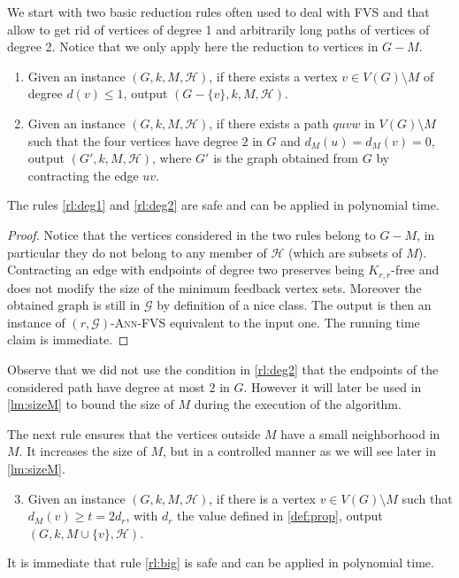 \documentclass{amsart}
\newcommand{\KR}[1]{KR$_ #1$}
\newcommand{\G}{\mathcal{G}}
\newcommand{\dM}{d_M}
\newcommand{\mH}{\mathcal{H}}
\newcommand{\FVS}{\textsc{FVS}\xspace}
\newcommand{\AFVS}{\textsc{$(r,\G)$-Ann-FVS}\xspace}
\newcommand{\ruleref}[1]{\hyperref[#1]{\ref*{#1}}}
\begin{document}
We start with two basic reduction rules often used to deal with \FVS and that allow to get rid of vertices of degree 1 and arbitrarily long paths of vertices of degree 2. Notice that we only apply here the reduction to vertices in $G-M$.
\begin{enumerate}[label=(\KR{{\arabic*}})]
\item \label{rl:deg1} Given an instance $(G, k, M, \mH)$, if there exists a vertex $v\in V(G)\setminus M$ of degree $d(v)\leq 1$, output $(G-\{v\}, k, M, \mH)$.

\item \label{rl:deg2} Given an instance $(G, k, M, \mH)$, if there exists a path $quvw$ in $V(G)\setminus M$ such that the four vertices have degree $2$ in $G$ and $\dM(u)=\dM(v)=0$, output $(G', k, M, \mH)$, where $G'$ is the graph obtained from $G$ by contracting the edge $uv$.
\end{enumerate}
\begin{lemma}
    The rules \ruleref{rl:deg1} and \ruleref{rl:deg2} are safe and can be applied in polynomial time.
\end{lemma}
\begin{proof}
Notice that the vertices considered in the two rules belong to $G-M$, in particular they do not belong to any member of $\mH$ (which are subsets of $M$). Contracting an edge with endpoints of degree two preserves being $K_{r,r}$-free and does not modify the size of the minimum feedback vertex sets. Moreover the obtained graph is still in $\G$ by definition of a nice class.
The output is then an instance of \AFVS equivalent to the input one. The running time claim is immediate.

\end{proof}
\begin{remark}
Observe that we did not use the condition in \ruleref{rl:deg2} that the endpoints of the considered path have degree at most $2$ in $G$. However it will later be used in \autoref{lm:sizeM} to bound the size of $M$ during the execution of the algorithm.
\end{remark}

The next rule ensures that the vertices outside $M$ have a small neighborhood in $M$. It increases the size of $M$, but in a controlled manner as we will see later in \autoref{lm:sizeM}. 

\begin{enumerate}[label=(\KR{{\arabic*}})]
\setcounter{enumi}{2}
\item \label{rl:big} Given an instance $(G, k, M, \mH)$, if there is a vertex $v\in V(G)\setminus M$ such that $d_M(v)\ge t=2d_r$, with $d_r$ the value defined in \autoref{def:prop}, output $(G, k, M\cup\{v\}, \mH)$.
\end{enumerate}
It is immediate that rule \ruleref{rl:big} is safe and can be applied in polynomial time.
\end{document}
